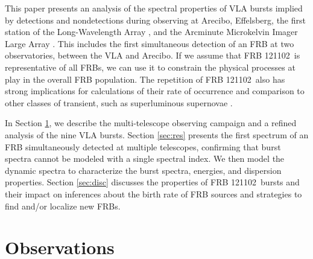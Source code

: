 \documentclass[twocolumn]{aastex61}
\newcommand{\frb}{FRB 121102}
\begin{document}
This paper presents an analysis of the spectral properties of VLA bursts implied by detections and nondetections during observing at Arecibo, Effelsberg, the first station of the Long-Wavelength Array \citep[LWA1; ][]{2013ITAP...61.2540E}, and the Arcminute Microkelvin Imager Large Array \citep[AMI-LA; ][]{2008MNRAS.391.1545Z}. This includes the first simultaneous detection of an FRB at two observatories, between the VLA and Arecibo. If we assume that \frb\ is representative of all FRBs, we can use it to constrain the physical processes at play in the overall FRB population. The repetition of \frb\ also has strong implications for calculations of their rate of occurrence \citep{2016MNRAS.458L..89C} and comparison to other classes of transient, such as superluminous supernovae \citep{OPT}.

In Section \ref{sec:obs}, we describe the multi-telescope observing campaign and a refined analysis of the nine VLA bursts. Section \ref{sec:res} presents the first spectrum of an FRB simultaneously detected at multiple telescopes, confirming that burst spectra cannot be modeled with a single spectral index. We then model the dynamic spectra to characterize the burst spectra, energies, and dispersion properties. Section \ref{sec:disc} discusses the properties of \frb\ bursts and their impact on inferences about the birth rate of FRB sources and strategies to find and/or localize new FRBs.

\section{Observations}
\label{sec:obs}
\end{document}
